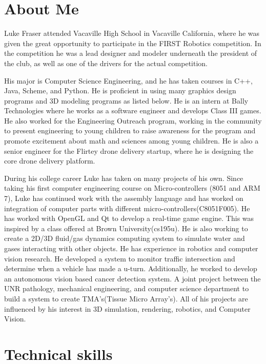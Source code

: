 \documentclass[11pt,a4paper,sans]{moderncv}        %
\begin{document}
\section{About Me}
Luke Fraser attended Vacaville High School in Vacaville California, where he was given the great opportunity to participate in the FIRST Robotics competition. In the competition he was a lead designer and modeler underneath the president of the club, as well as one of the drivers for the actual competition. \vspace{.15cm}

His major is Computer Science Engineering, and he has taken courses in C++,  Java, Scheme, and Python. He is proficient in using many graphics design programs and 3D modeling programs as listed below. He is an intern at Bally Technologies where he works as a software engineer and develops Class III games. He also worked for the Engineering Outreach program, working in the community to present engineering to young children to raise awareness for the program and promote excitement about math and sciences among young children. He is also a senior engineer for the Flirtey drone delivery startup, where he is designing the core drone delivery platform.\vspace{.15cm}

During his college career Luke has taken on many projects of his own. Since taking his first computer engineering  course  on  Micro-controllers (8051 and ARM 7), Luke has continued work with the assembly language and has worked on integration of computer parts with different micro-controllers(C8051F005). He has worked with OpenGL and Qt to develop a real-time game engine. This was inspired by a class offered at Brown University(cs195u). He is also working to create a 2D/3D fluid/gas dynamics computing system to simulate water and gases interacting with other objects. He has experience in robotics and computer vision research. He developed a system to monitor traffic intersection and determine when a vehicle has made a u-turn. Additionally, he worked to develop an autonomous vision based cancer detection system. A joint project between the UNR pathology, mechanical engineering, and computer science department to build a system to create TMA's(Tissue Micro Array's). All of his projects are influenced by his interest in 3D simulation, rendering, robotics, and Computer Vision.\\

\section{Technical skills}
\end{document}
